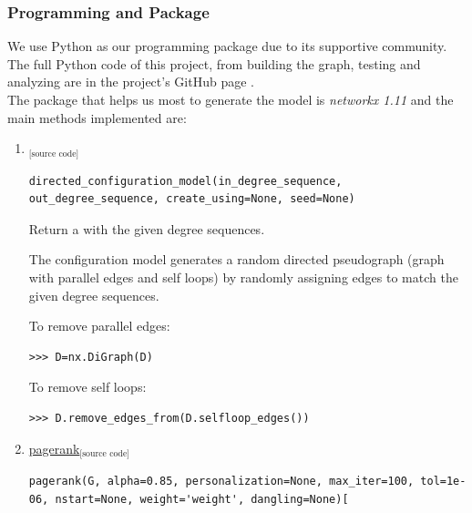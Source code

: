 \documentclass{article}
\begin{document}
		\subsubsection{Programming and Package}
We use Python as our programming package due to its supportive community. The full Python code of this project, from building the graph, testing and analyzing are in the project's GitHub page \cite{git}. \\
The package that helps us most to generate the model is \emph{networkx 1.11} \cite{networkx} and the main methods implemented are:
\begin{enumerate}
\item \href{https://networkx.github.io/documentation/networkx-1.11/reference/generated/networkx.generators.degree_seq.directed_configuration_model.html?highlight=directed%20configuration%20model#networkx.generators.degree_seq.directed_configuration_model}{\text{directed\_configuration\_model}}\href{https://networkx.github.io/documentation/networkx-1.11/_modules/networkx/generators/degree_seq.html#directed_configuration_model}{$_{\text{[source code]}}$}

\begin{lstlisting}
directed_configuration_model(in_degree_sequence, out_degree_sequence, create_using=None, seed=None) 
\end{lstlisting}

Return a  with the given degree sequences.

The configuration model generates a random directed pseudograph (graph with parallel edges and self loops) by randomly assigning edges to match the given degree sequences.

To remove parallel edges:
\begin{lstlisting}
>>> D=nx.DiGraph(D)
\end{lstlisting}
To remove self loops:
\begin{lstlisting}
>>> D.remove_edges_from(D.selfloop_edges())
\end{lstlisting}

\item \href{https://networkx.github.io/documentation/networkx-1.11/reference/generated/networkx.algorithms.link_analysis.pagerank_alg.pagerank.html?highlight=pagerank}{pagerank}\href{https://networkx.github.io/documentation/networkx-1.11/_modules/networkx/algorithms/link_analysis/pagerank_alg.html#pagerank}{$_{\text{[source code]}}$}
\begin{lstlisting}
pagerank(G, alpha=0.85, personalization=None, max_iter=100, tol=1e-06, nstart=None, weight='weight', dangling=None)[
\end{lstlisting}


\end{enumerate}
\end{document}
